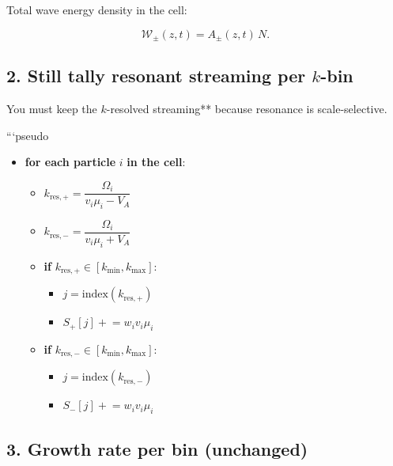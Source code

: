 Total wave energy density in the cell:

$$
\mathcal W_\pm(z,t)=A_\pm(z,t)\,N .
$$


\subsection{ 2.  Still tally resonant streaming per $k$-bin}

You must keep the {\it $k$}-resolved streaming** because resonance is scale-selective.

```pseudo

\begin{tcolorbox}[colframe=black, colback=white, title=Streaming Accumulation per Particle]
\begin{itemize}
    \item \textbf{for each particle} \( i \) \textbf{in the cell}:
    \begin{itemize}
        \item \( k_{\text{res},+} = \dfrac{\Omega_i}{v_i \mu_i - V_A} \) \quad {}
        \item \( k_{\text{res},-} = \dfrac{\Omega_i}{v_i \mu_i + V_A} \) \quad {}
        \item \textbf{if} \( k_{\text{res},+} \in [k_{\text{min}}, k_{\text{max}}] \):
        \begin{itemize}
            \item \( j = \text{index}(k_{\text{res},+}) \)
            \item \( S_{+}[j] \mathrel{+}= w_i v_i \mu_i \)
        \end{itemize}
        \item \textbf{if} \( k_{\text{res},-} \in [k_{\text{min}}, k_{\text{max}}] \):
        \begin{itemize}
            \item \( j = \text{index}(k_{\text{res},-}) \)
            \item \( S_{-}[j] \mathrel{+}= w_i v_i \mu_i \)
        \end{itemize}
    \end{itemize}
\end{itemize}
\end{tcolorbox}



\subsection{ 3.  Growth rate per bin (unchanged)}

